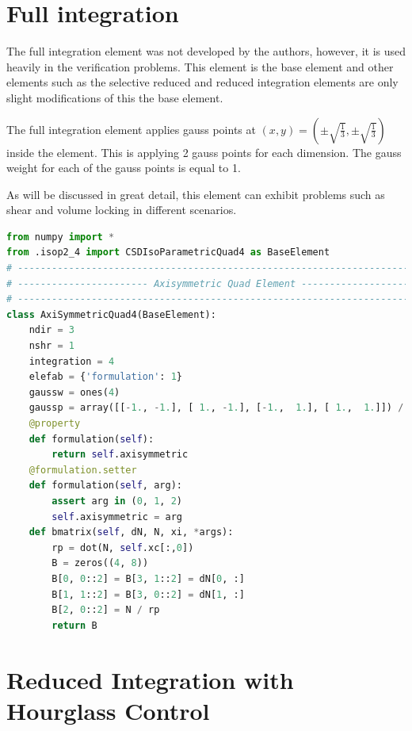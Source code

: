 \documentclass[10pt,letterpaper]{report}
\numberwithin{equation}{chapter}
\begin{document}
\section{Full integration}
The full integration element was not developed by the authors, however, it is used heavily in the verification problems. This element is the base element and other elements such as the selective reduced and reduced integration elements are only slight modifications of this the base element.

The full integration element applies gauss points at $(x,y)=(\pm\sqrt{\frac{1}{3}},\pm\sqrt{\frac{1}{3}})$ inside the element. This is applying 2 gauss points for each dimension. The gauss weight for each of the gauss points is equal to 1.

As will be discussed in great detail, this element can exhibit problems such as shear and volume locking in different scenarios.
\begin{lstlisting}[language=python]
from numpy import *
from .isop2_4 import CSDIsoParametricQuad4 as BaseElement
# --------------------------------------------------------------------------- #
# ----------------------- Axisymmetric Quad Element ------------------------- #
# --------------------------------------------------------------------------- #
class AxiSymmetricQuad4(BaseElement):
    ndir = 3
    nshr = 1
    integration = 4
    elefab = {'formulation': 1}
    gaussw = ones(4)
    gaussp = array([[-1., -1.], [ 1., -1.], [-1.,  1.], [ 1.,  1.]]) / sqrt(3.)
    @property
    def formulation(self):
        return self.axisymmetric
    @formulation.setter
    def formulation(self, arg):
        assert arg in (0, 1, 2)
        self.axisymmetric = arg
    def bmatrix(self, dN, N, xi, *args):
        rp = dot(N, self.xc[:,0])
        B = zeros((4, 8))
        B[0, 0::2] = B[3, 1::2] = dN[0, :]
        B[1, 1::2] = B[3, 0::2] = dN[1, :]
        B[2, 0::2] = N / rp
        return B

\end{lstlisting}


\section{Reduced Integration with Hourglass Control}
\end{document}
